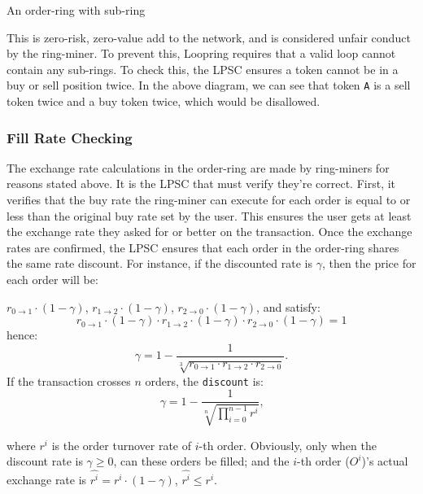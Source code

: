 \documentclass[UTF8,nofonts]{article}
\makeatletter
\newenvironment{figurehere}
 {\def\@captype{figure}}
 {}
\makeatother
\begin{document}
\begin{multicols}{2}
\begin{center}
\begin{figurehere}
\begin{tikzpicture}
\end{tikzpicture}

\caption{An order-ring with sub-ring}
\label{fig:subring}
\end{figurehere}
\end{center}

This is zero-risk, zero-value add to the network, and is considered unfair conduct by the ring-miner. To prevent this, Loopring requires that a valid loop cannot contain any sub-rings. To check this, the LPSC ensures a token cannot be in a buy or sell position twice. In the above diagram, we can see that token \verb|A| is a sell token twice and a buy token twice, which would be disallowed. 


\subsubsection{Fill Rate Checking\label{sec:fill_rate_check}}


The exchange rate calculations in the order-ring are made by ring-miners for reasons stated above. It is the LPSC that must verify they're correct. First, it verifies that the buy rate the ring-miner can execute for each order is equal to or less than the original buy rate set by the user. This ensures the user gets at least the exchange rate they asked for or better on the transaction. Once the exchange rates are confirmed, the LPSC ensures that each order in the order-ring shares the same rate discount. For instance, if the discounted rate is $\gamma$, then the price for each order will be:

$r_{0\rightarrow 1} \cdot (1-\gamma)$, $r_{1\rightarrow 2} \cdot (1-\gamma)$, $r_{2 \rightarrow 0} \cdot (1-\gamma)$, and satisfy: 
\begin{equation}
r_{0\rightarrow 1} \cdot (1-\gamma)\cdot r_{1\rightarrow 2} \cdot (1-\gamma) \cdot r_{2 \rightarrow 0} \cdot (1-\gamma) = 1
\end{equation}
hence: 
\begin{equation}
\gamma = 1- \frac{1}{\sqrt[3]{r_{0\rightarrow 1} \cdot r_{1\rightarrow 2} \cdot r_{2\rightarrow 0}}}\text{.}
\end{equation}
If the transaction crosses $n$ orders, the \texttt{discount} is: 
\begin{equation}
\gamma = 1- \frac{1}{\sqrt[n]{\prod_{i=0}^{n-1} r^i}} \text{,}
\end{equation}

where $r^i$ is the order turnover rate of $i$-th order. Obviously, only when the discount rate is $\gamma \ge 0$, can these orders be filled; and the $i$-th order ($O^i$)'s actual exchange rate is $\hat{r^i} = r^i \cdot (1-\gamma)$, $\hat{r^i}\le r^i$.


\end{multicols}
\end{document}
